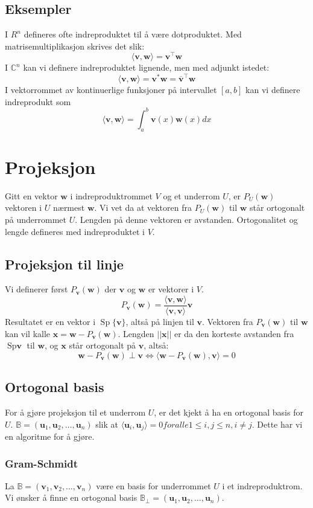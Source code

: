 \documentclass[12pt,a4paper,norsk]{article}
\newcommand{\C}{\mathbb{C}}
\newcommand{\B}{\mathbb{B}}
\newcommand{\inner}[1]{\langle#1\rangle}
\DeclareMathOperator{\Sp}{Sp} %
\newcommand{\vv}{\textbf{v}}
\newcommand{\vw}{\textbf{w}}
\newcommand{\vu}{\textbf{u}}
\newcommand{\vx}{\textbf{x}}
\begin{document}
\subsection{Eksempler}
I $R^{n}$ defineres ofte indreproduktet til å være dotproduktet. Med
matrisemultiplikasjon skrives det slik:
\[\inner{\vv,\vw} = \vv^{\top}\vw\]
I $\C^{n}$ kan vi definere indreproduktet lignende, men med adjunkt istedet:
\[\inner{\vv,\vw} = \vv^{*}\vw = \overline{\vv}^{\top}\vw\]
I vektorrommet av kontinuerlige funksjoner på intervallet $[a,b]$ kan vi
definere indreprodukt som
\[\inner{\vv,\vw} = \int_{a}^{b} \vv(x)\vw(x) dx\]

\section{Projeksjon}\label{sec:projeksjoner}
Gitt en vektor $\vw$ i indreproduktrommet $V$ og et underrom $U$, er $P_{U}(\vw)$ vektoren i $U$
nærmest $\vw$. Vi vet da at vektoren fra $P_{U}(\vw)$ til $\vw$ står ortogonalt på
underrommet $U$. Lengden på denne vektoren er avstanden. Ortogonalitet og lengde
defineres med indreproduktet i $V$.

\subsection{Projeksjon til linje}
Vi definerer først $P_{\vv}(\vw)$ der $\vv$ og $\vw$ er vektorer i $V$.
\[P_{\vv}(\vw) = \frac{\inner{\vv,\vw}}{\inner{\vv,\vv}}\vv\]
Resultatet er en vektor i $\Sp\{\vv\}$, altså på linjen til $\vv$. Vektoren
fra $P_{\vv}(\vw)$ til $\vw$ kan vil kalle $\vx = \vw - P_{\vv}(\vw)$. Lengden
$||\vx||$ er da den korteste avstanden fra $\Sp{\vv}$ til $\vw$, og $\vx$ står
ortogonalt på $\vv$, altså:
\[\vw-P_{\vv}(\vw) \perp \vv  \iff \inner{\vw-P_{\vv}(\vw), \vv} = 0\]

\subsection{Ortogonal basis}
For å gjøre projeksjon til et underrom $U$, er det kjekt å ha en ortogonal
basis for $U$. $\B=(\vu_{1}, \vu_{2}, \ldots, \vu_{n})$ slik at
$\inner{\vu_{i}, \vu_{j}} = 0 for alle 1 \leq i,j \leq n, i \neq j$. Dette har vi en
algoritme for å gjøre.

\subsubsection{Gram-Schmidt}
La $\B=(\vv_{1}, \vv_{2}, \ldots, \vv_{n})$ være en basis for underrommet $U$ i
et indreproduktrom. Vi ønsker å finne en ortogonal basis
$\B_{\perp}=(\vu_{1}, \vu_{2}, \ldots, \vu_{n})$.
\end{document}
